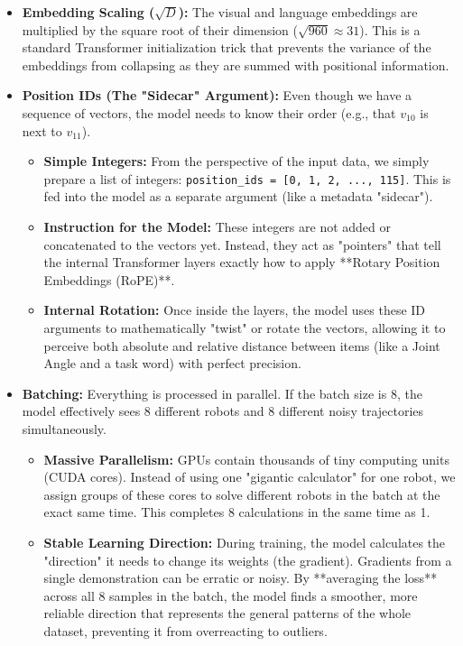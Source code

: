 \documentclass[11pt,a4paper]{article}
\begin{document}
\begin{itemize}
    \item \textbf{Embedding Scaling ($\sqrt{D}$):} The visual and language embeddings are multiplied by the square root of their dimension ($\sqrt{960} \approx 31$). This is a standard Transformer initialization trick that prevents the variance of the embeddings from collapsing as they are summed with positional information.
    \item \textbf{Position IDs (The "Sidecar" Argument):} Even though we have a sequence of vectors, the model needs to know their order (e.g., that $v_{10}$ is next to $v_{11}$). 
    \begin{itemize}
        \item \textbf{Simple Integers:} From the perspective of the input data, we simply prepare a list of integers: \texttt{position\_ids = [0, 1, 2, ..., 115]}. This is fed into the model as a separate argument (like a metadata "sidecar").
        \item \textbf{Instruction for the Model:} These integers are not added or concatenated to the vectors yet. Instead, they act as "pointers" that tell the internal Transformer layers exactly how to apply **Rotary Position Embeddings (RoPE)**. 
        \item \textbf{Internal Rotation:} Once inside the layers, the model uses these ID arguments to mathematically "twist" or rotate the vectors, allowing it to perceive both absolute and relative distance between items (like a Joint Angle and a task word) with perfect precision.
    \end{itemize}
    \item \textbf{Batching:} Everything is processed in parallel. If the batch size is 8, the model effectively sees 8 different robots and 8 different noisy trajectories simultaneously.
    \begin{itemize}
        \item \textbf{Massive Parallelism:} GPUs contain thousands of tiny computing units (CUDA cores). Instead of using one "gigantic calculator" for one robot, we assign groups of these cores to solve different robots in the batch at the exact same time. This completes 8 calculations in the same time as 1.
        \item \textbf{Stable Learning Direction:} During training, the model calculates the "direction" it needs to change its weights (the gradient). Gradients from a single demonstration can be erratic or noisy. By **averaging the loss** across all 8 samples in the batch, the model finds a smoother, more reliable direction that represents the general patterns of the whole dataset, preventing it from overreacting to outliers.

\end{itemize}
\end{itemize}
\end{document}
